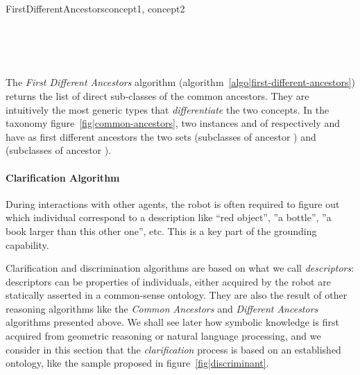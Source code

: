 \small
\begin{pseudocode}[ruled]{FirstDifferentAncestors}{concept1, concept2}
\label{algo|first-different-ancestors}

\BEGIN
{} \GETS {} \\
 \GETS {} \cup {} \\

 \\
\END

\end{pseudocode}
\normalsize

The \emph{First Different Ancestors} algorithm
(algorithm~\ref{algo|first-different-ancestors}) returns the list of direct
sub-classes of the common ancestors. They are intuitively the most generic
types that \emph{differentiate} the two concepts. In the taxonomy
figure~\ref{fig|common-ancestors}, two instances  and  of
respectively  and  have as first different
ancestors the two sets  (subclasses of ancestor
) and  (subclasses of
ancestor ).

\paragraph{Clarification Algorithm}
\label{sect|clarify}

During interactions with other agents, the robot is often required to figure
out which individual correspond to a description like ``red object'', ''a
bottle'', ''a book larger than this other one'', etc. This is a key part of the
grounding capability.

Clarification and discrimination algorithms are based on what we call
\emph{descriptors}: descriptors can be properties of individuals, either
acquired by the robot are statically asserted in a common-sense ontology. They
are also the result of other reasoning algorithms like the \emph{Common
Ancestors} and \emph{Different Ancestors} algorithms presented above.
We shall see later how symbolic knowledge is first acquired from geometric
reasoning or natural language processing, and we consider in this section that
the \emph{clarification} process is based on an established ontology, like the
sample proposed in figure~\ref{fig|discriminant}.

